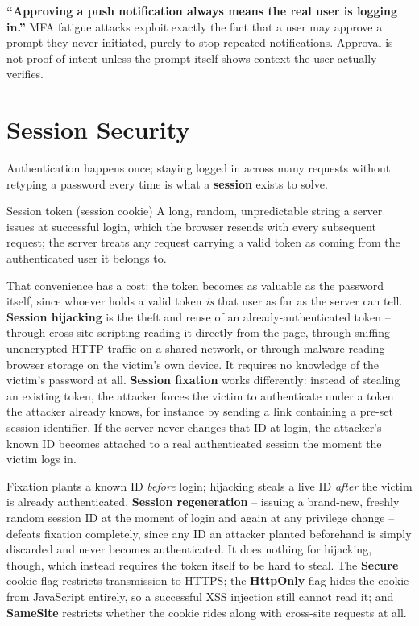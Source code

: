 \begin{misconception}
\textbf{``Approving a push notification always means the real user is logging in.''} MFA fatigue
attacks exploit exactly the fact that a user may approve a prompt they never initiated, purely to
stop repeated notifications. Approval is not proof of intent unless the prompt itself shows context
the user actually verifies.
\end{misconception}

\section{Session Security}

Authentication happens once; staying logged in across many requests without retyping a password
every time is what a \textbf{session} exists to solve.

\begin{definition}{Session token (session cookie)}
A long, random, unpredictable string a server issues at successful login, which the browser
resends with every subsequent request; the server treats any request carrying a valid token as
coming from the authenticated user it belongs to.
\end{definition}

That convenience has a cost: the token becomes as valuable as the password itself, since whoever
holds a valid token \emph{is} that user as far as the server can tell. \textbf{Session hijacking}
is the theft and reuse of an already-authenticated token -- through cross-site scripting reading it
directly from the page, through sniffing unencrypted HTTP traffic on a shared network, or through
malware reading browser storage on the victim's own device. It requires no knowledge of the
victim's password at all. \textbf{Session fixation} works differently: instead of stealing an
existing token, the attacker forces the victim to authenticate under a token the attacker already
knows, for instance by sending a link containing a pre-set session identifier. If the server never
changes that ID at login, the attacker's known ID becomes attached to a real authenticated session
the moment the victim logs in.

\begin{example}
Fixation plants a known ID \emph{before} login; hijacking steals a live ID \emph{after} the victim
is already authenticated. \textbf{Session regeneration} -- issuing a brand-new, freshly random
session ID at the moment of login and again at any privilege change -- defeats fixation completely,
since any ID an attacker planted beforehand is simply discarded and never becomes authenticated. It
does nothing for hijacking, though, which instead requires the token itself to be hard to steal.
The \textbf{Secure} cookie flag restricts transmission to HTTPS; the \textbf{HttpOnly} flag hides
the cookie from JavaScript entirely, so a successful XSS injection still cannot read it; and
\textbf{SameSite} restricts whether the cookie rides along with cross-site requests at all.
\end{example}

